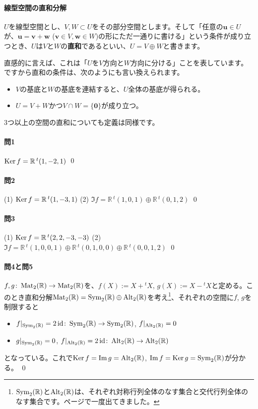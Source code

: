 \paragraph{線型空間の直和分解} $U$を線型空間とし、$V, W\subset U$をその部分空間とします。そして「任意の$\bm{u} \in U$が、$\bm{u} = \bm{v} + \bm{w}$ ($\bm{v} \in V, \bm{w}\in W$)の形にただ一通りに書ける」という条件が成り立つとき、$U$は$V$と$W$の\textbf{直和}であるといい、$U = V \oplus W$と書きます。

直感的に言えば、これは「$U$を$V$方向と$W$方向に分ける」ことを表しています。ですから直和の条件は、次のようにも言い換えられます。
\begin{itemize}
\item $V$の基底と$W$の基底を連結すると、$U$全体の基底が得られる。
\item $U = V + W$かつ$V\cap W = \{\bm{0}\}$が成り立つ。
\end{itemize}
$3$つ以上の空間の直和についても定義は同様です。

\paragraph{問1} $\operatorname{Ker} f = \mathbb{R}\,{}^t(1, -2, 1)$ \qed

\paragraph{問2} (1) $\operatorname{Ker} f = \mathbb{R}\,{}^t(1, -3, 1)$ (2) $\Im f = \mathbb{R}\,{}^t(1, 0, 1) \oplus \mathbb{R}\,{}^t(0, 1, 2)$ \qed

\paragraph{問3} (1) $\operatorname{Ker} f = \mathbb{R}\,{}^t(2, 2, -3, -3)$ (2) $\Im f = \mathbb{R}\,{}^t(1, 0, 0 ,1) \oplus \mathbb{R}\,{}^t(0, 1, 0 ,0) \oplus \mathbb{R}\,{}^t(0, 0, 1 ,2)$ \qed

\paragraph{問4と問5}

$f, g\colon \operatorname{Mat}_2(\mathbb{R}) \rightarrow \operatorname{Mat}_2(\mathbb{R})$を、$f(X) := X + {}^t X$, $g(X) := X - {}^t X$と定める。このとき直和分解$\operatorname{Mat}_2(\mathbb{R}) = \operatorname{Sym}_2(\mathbb{R}) \oplus \operatorname{Alt}_2(\mathbb{R})$を考え\footnote{$\operatorname{Sym}_2(\mathbb{R})$と$\operatorname{Alt}_2(\mathbb{R})$は、それぞれ対称行列全体のなす集合と交代行列全体のなす集合です。\pageref{paragraph:symmetric_matrices}ページで一度出てきました。}、それぞれの空間に$f$, $g$を制限すると
\begin{itemize}
\item $f|_{\operatorname{Sym}_2(\mathbb{R})} = 2\operatorname{id}\colon \operatorname{Sym}_2(\mathbb{R})\rightarrow \operatorname{Sym}_2(\mathbb{R})$, $f|_{\operatorname{Alt}_2(\mathbb{R})} = 0$
\item $g|_{\operatorname{Sym}_2(\mathbb{R})} = 0$, $f|_{\operatorname{Alt}_2(\mathbb{R})} = 2\operatorname{id}\colon \operatorname{Alt}_2(\mathbb{R})\rightarrow \operatorname{Alt}_2(\mathbb{R})$
\end{itemize}
となっている。これで$\operatorname{Ker} f = \mathrm{Im}\, g = \operatorname{Alt}_2(\mathbb{R})$, $\mathrm{Im}\, f = \operatorname{Ker} g = \operatorname{Sym}_2(\mathbb{R})$が分かる。 \qed

